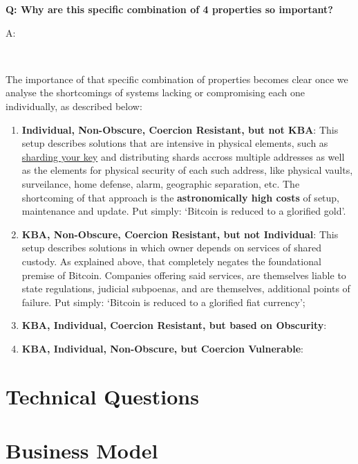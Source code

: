\documentclass[12pt,a4paper]{article}
\newenvironment{question}[1]{%
  \vspace{0.8em}\noindent\textbf{Q: #1}\par
  \vspace{0.2em}\noindent\begin{itshape}A:\end{itshape}~%
}{\vspace{0.8em}}
\begin{document}
\begin{question}{Why are this specific combination of 4 properties so important?}
 The importance of that specific combination of properties becomes clear once we analyse the shortcomings of systems lacking or compromising each one individually, as described below:
 \begin{enumerate}
  \item \textbf{Individual, Non-Obscure, Coercion Resistant, but not KBA}: This setup describes solutions that are intensive in physical elements, such as \href{https://iancoleman.io/shamir39/}{sharding your key} and distributing shards accross multiple addresses as well as the elements for physical security of each such address, like physical vaults, surveilance, home defense, alarm, geographic separation, etc. The shortcoming of that approach is the \textbf{astronomically high costs} of setup, maintenance and update. Put simply: `Bitcoin is reduced to a glorified gold'.
  \item \textbf{KBA, Non-Obscure, Coercion Resistant, but not Individual}: This setup describes solutions in which owner depends on services of shared custody. As explained above, that completely negates the foundational premise of Bitcoin. Companies offering said services, are themselves liable to state regulations, judicial subpoenas, and are themselves, additional points of failure. Put simply: `Bitcoin is reduced to a glorified fiat currency';
  \item \textbf{KBA, Individual, Coercion Resistant, but based on Obscurity}:
  \item \textbf{KBA, Individual, Non-Obscure, but Coercion Vulnerable}:
 \end{enumerate}

\end{question}

\section{Technical Questions}


\section{Business Model}
\end{document}
